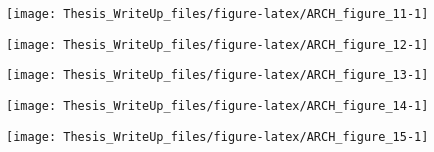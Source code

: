 \documentclass[11pt,preprint, authoryear]{elsarticle}
\let\origfigure\figure
\let\endorigfigure\endfigure
\renewenvironment{figure}[1][2] {
    \expandafter\origfigure\expandafter[H]
} {
    \endorigfigure
}
\numberwithin{equation}{section}
\numberwithin{figure}{section}
\numberwithin{table}{section}
\begin{document}
\begin{figure}[H]

{\centering \texttt{[image: Thesis\_WriteUp\_files/figure-latex/ARCH\_figure\_11-1]} 

}

\caption{Autocorrelation and partial-autocorrelation functions of model 4 - GARCH(1,1) -  residuals \label{Figure11}}\label{fig:ARCH_figure_11}
\end{figure}

\begin{figure}[H]

{\centering \texttt{[image: Thesis\_WriteUp\_files/figure-latex/ARCH\_figure\_12-1]} 

}

\caption{Autocorrelation and partial-autocorrelation functions of model 5 - EGARCH(1,1) -  residuals \label{Figure12}}\label{fig:ARCH_figure_12}
\end{figure}

\begin{figure}[H]

{\centering \texttt{[image: Thesis\_WriteUp\_files/figure-latex/ARCH\_figure\_13-1]} 

}

\caption{Autocorrelation and partial-autocorrelation functions of model 6 - ARMA(1,0) ARCH(1,0) - residuals \label{Figure13}}\label{fig:ARCH_figure_13}
\end{figure}

\begin{figure}[H]

{\centering \texttt{[image: Thesis\_WriteUp\_files/figure-latex/ARCH\_figure\_14-1]} 

}

\caption{Autocorrelation and partial-autocorrelation functions of model 7 - ARCH(1,0) - residuals \label{Figure14}}\label{fig:ARCH_figure_14}
\end{figure}

\begin{figure}[H]

{\centering \texttt{[image: Thesis\_WriteUp\_files/figure-latex/ARCH\_figure\_15-1]} 

}

\caption{Autocorrelation and partial-autocorrelation functions of model 8 - ARMA(2,0) GARCH(1,1) - residuals \label{Figure15}}\label{fig:ARCH_figure_15}
\end{figure}
\end{document}
